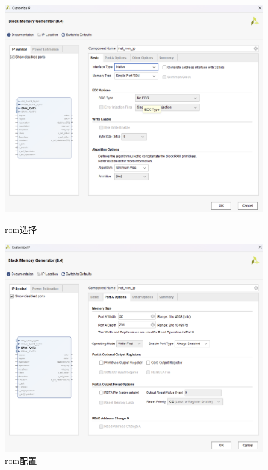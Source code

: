 \documentclass[a4paper]{article}
\begin{document}
\begin{figure}[H]
    \centering    
    \begin{minipage}[t]{0.48\textwidth}
        \centering
        \includegraphics[width=\textwidth]{img/复现流水线/配置rom.png}
        \caption{rom选择}
    \end{minipage}
    \hfill
    \begin{minipage}[t]{0.48\textwidth}
        \centering
        \includegraphics[width=\textwidth]{img/复现流水线/配置ram.png}
        \caption{rom配置}
    \end{minipage}
\end{figure}
\end{document}
